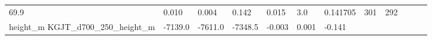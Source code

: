 \documentclass[11pt]{article}
\begin{document}
\begin{longtable}[]{@{}llllllllllll@{}}
\begin{minipage}[t]{0.04\columnwidth}
69.9\strut
\end{minipage} & \begin{minipage}[t]{0.04\columnwidth}\raggedright\strut
0.010\strut
\end{minipage} & \begin{minipage}[t]{0.05\columnwidth}\raggedright\strut
0.004\strut
\end{minipage} & \begin{minipage}[t]{0.04\columnwidth}\raggedright\strut
0.142\strut
\end{minipage} & \begin{minipage}[t]{0.04\columnwidth}\raggedright\strut
0.015\strut
\end{minipage} & \begin{minipage}[t]{0.05\columnwidth}\raggedright\strut
3.0\strut
\end{minipage} & \begin{minipage}[t]{0.05\columnwidth}\raggedright\strut
0.141705\strut
\end{minipage} & \begin{minipage}[t]{0.05\columnwidth}\raggedright\strut
301\strut
\end{minipage} & \begin{minipage}[t]{0.07\columnwidth}\raggedright\strut
292\strut
\end{minipage}\tabularnewline
\begin{minipage}[t]{0.18\columnwidth}\raggedright\strut
height\_m KGJT\_d700\_250\_height\_m\strut
\end{minipage} & \begin{minipage}[t]{0.04\columnwidth}\raggedright\strut
-7139.0\strut
\end{minipage} & \begin{minipage}[t]{0.04\columnwidth}\raggedright\strut
-7611.0\strut
\end{minipage} & \begin{minipage}[t]{0.04\columnwidth}\raggedright\strut
-7348.5\strut
\end{minipage} & \begin{minipage}[t]{0.04\columnwidth}\raggedright\strut
-0.003\strut
\end{minipage} & \begin{minipage}[t]{0.05\columnwidth}\raggedright\strut
0.001\strut
\end{minipage} & \begin{minipage}[t]{0.04\columnwidth}\raggedright\strut
-0.141\strut
\end{minipage} & \begin{minipage}[t]{0.04\columnwidth}\raggedright\strut

\end{minipage}
\end{longtable}
\end{document}
